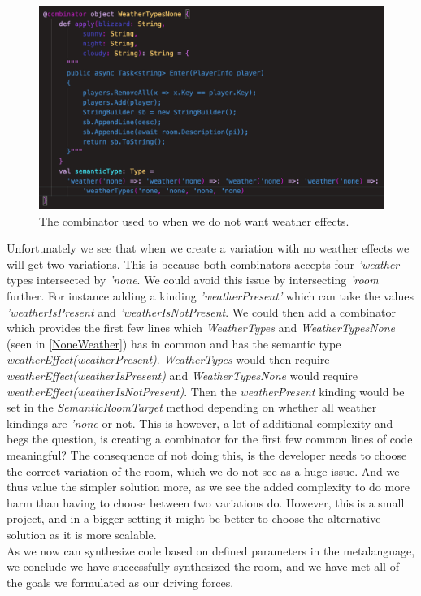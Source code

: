 \begin{figure}[H]
	\centering
	\includegraphics[width=\linewidth]{Materials/Decomposition/Room/NoneWeather}
	\caption{The combinator used to when we do not want weather effects.}
	\label{NoneWeather}
\end{figure}
Unfortunately we see that when we create a variation with no weather effects we will get two variations. This is because both combinators accepts four \textit{'weather} types intersected by \textit{'none}. We could avoid this issue by intersecting \textit{'room} further. For instance adding a kinding \textit{'weatherPresent'} which can take the values \textit{'weatherIsPresent} and \textit{'weatherIsNotPresent}. We could then add a combinator which provides the first few lines which \textit{WeatherTypes} and \textit{WeatherTypesNone} (seen in \autoref{NoneWeather}) has in common and has the semantic type \textit{weatherEffect(weatherPresent)}. \textit{WeatherTypes} would then require \textit{weatherEffect(weatherIsPresent)} and \textit{WeatherTypesNone} would require \textit{weatherEffect(weatherIsNotPresent)}. Then the \textit{weatherPresent} kinding would be set in the \textit{SemanticRoomTarget} method depending on whether all weather kindings are \textit{'none} or not. This is however, a lot of additional complexity and begs the question, is creating a combinator for the first few common lines of code meaningful? The consequence of not doing this, is the developer needs to choose the correct variation of the room, which we do not see as a huge issue. And we thus value the simpler solution more, as we see the added complexity to do more harm than having to choose between two variations do. However, this is a small project, and in a bigger setting it might be better to choose the alternative solution as it is more scalable.\\

As we now can synthesize code based on defined parameters in the metalanguage, we conclude we have successfully synthesized the room, and we have met all of the goals we formulated as our driving forces.

